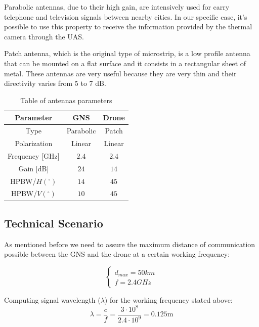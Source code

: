 Parabolic antennas, due to their high gain, are intensively used for carry telephone and television signals between nearby cities. In our specific case, it’s possible to use this property to receive the information provided by the thermal camera through the UAS.

Patch antenna, which is the original type of microstrip, is a low profile antenna that can be mounted on a flat surface and it consists in a rectangular sheet of metal. These antennas are very useful because they are very thin and their directivity varies from 5 to 7 dB.

\begin{table}[h!]
	\centering
	\begin{tabular}{|c||c|c|}
		\hline
		Parameter & GNS & Drone\\ \hline\hline
		Type & Parabolic & Patch\\ \hline
		Polarization & Linear & Linear\\ \hline
		Frequency [GHz] & $2.4$ & $2.4$\\ \hline
		Gain [dB] & $24$ & $14$\\ \hline
		HPBW/$H(^{\circ})$ & $14$ & $45$\\ \hline
		HPBW/$V(^{\circ})$ & $10$ & $45$\\ \hline
	\end{tabular}
	\caption{Table of antennas parameters}
	\label{table:1}
\end{table}

\subsection{Technical Scenario}
As mentioned before we need to assure the maximum distance of communication possible between the GNS and the drone at a certain working frequency:

\begin{equation*}\label{eq:tech_parameters1} 
 	\begin{cases}
 		d_{max} = 50 km	\\
 		f = 2.4 GHz
 	\end{cases}
\end{equation*}

Computing signal wavelength ($\lambda$) for the working frequency stated above:
\begin{equation*}\label{eq:tech_parameters2}
	\lambda = \frac{c}{f} = \frac{3\cdot 10^{8}}{2.4\cdot 10^{9}} 
	        = 0.125 \text{m}
\end{equation*}

